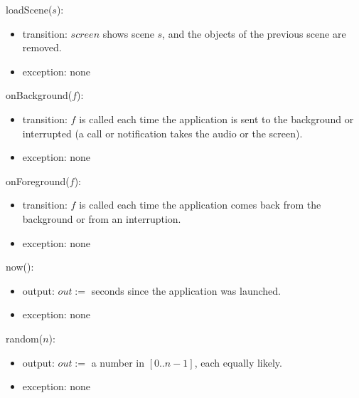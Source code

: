 \documentclass[10pt, titlepage]{article}
\newcommand{\T}[1]{\mathit{#1}}          %
\newcommand{\out}{\mathit{out}}
\begin{document}
\begin{samepage}
\noindent loadScene($s$):
\begin{itemize}
\item transition: $\T{screen}$ shows scene $s$, and the objects of the previous
  scene are removed.
\item exception: none
\end{itemize}
\end{samepage}
\par\pagebreak[0]

\begin{samepage}
\noindent onBackground($f$):
\begin{itemize}
\item transition: $f$ is called each time the application is sent to the
  background or interrupted (a call or notification takes the audio or the
  screen).
\item exception: none
\end{itemize}
\end{samepage}
\par\pagebreak[0]

\begin{samepage}
\noindent onForeground($f$):
\begin{itemize}
\item transition: $f$ is called each time the application comes back from
  the background or from an interruption.
\item exception: none
\end{itemize}
\end{samepage}
\par\pagebreak[0]

\begin{samepage}
\noindent now():
\begin{itemize}
\item output: $\out :=$ seconds since the application was launched.
\item exception: none
\end{itemize}
\end{samepage}
\par\pagebreak[0]

\begin{samepage}
\noindent random($n$):
\begin{itemize}
\item output: $\out := $ a number in $[0..n-1]$, each equally likely.
\item exception: none
\end{itemize}
\end{samepage}
\par\pagebreak[0]
\end{document}
